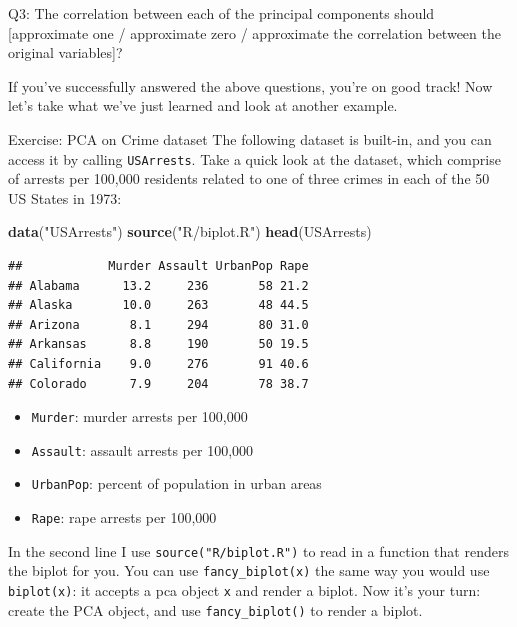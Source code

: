 \documentclass[]{article}
\newenvironment{Shaded}{\begin{snugshade}}{\end{snugshade}}
\newcommand{\KeywordTok}[1]{\textcolor[rgb]{0.13,0.29,0.53}{\textbf{#1}}}
\newcommand{\NormalTok}[1]{#1}
\newcommand{\StringTok}[1]{\textcolor[rgb]{0.31,0.60,0.02}{#1}}
\providecommand{\tightlist}{%
  \setlength{\itemsep}{0pt}\setlength{\parskip}{0pt}}
\begin{document}
Q3: The correlation between each of the principal components should
{[}approximate one / approximate zero / approximate the correlation
between the original variables{]}?

If you've successfully answered the above questions, you're on good
track! Now let's take what we've just learned and look at another
example.

Exercise: PCA on Crime dataset The following dataset is built-in, and
you can access it by calling \texttt{USArrests}. Take a quick look at
the dataset, which comprise of arrests per 100,000 residents related to
one of three crimes in each of the 50 US States in 1973:

\begin{Shaded}
\begin{Highlighting}[]
\KeywordTok{data}\NormalTok{(}\StringTok{"USArrests"}\NormalTok{)}
\KeywordTok{source}\NormalTok{(}\StringTok{"R/biplot.R"}\NormalTok{)}
\KeywordTok{head}\NormalTok{(USArrests)}
\end{Highlighting}
\end{Shaded}

\begin{verbatim}
##            Murder Assault UrbanPop Rape
## Alabama      13.2     236       58 21.2
## Alaska       10.0     263       48 44.5
## Arizona       8.1     294       80 31.0
## Arkansas      8.8     190       50 19.5
## California    9.0     276       91 40.6
## Colorado      7.9     204       78 38.7
\end{verbatim}

\begin{itemize}
\tightlist
\item
  \texttt{Murder}: murder arrests per 100,000\\
\item
  \texttt{Assault}: assault arrests per 100,000\\
\item
  \texttt{UrbanPop}: percent of population in urban areas\\
\item
  \texttt{Rape}: rape arrests per 100,000
\end{itemize}

In the second line I use \texttt{source("R/biplot.R")} to read in a
function that renders the biplot for you. You can use
\texttt{fancy\_biplot(x)} the same way you would use \texttt{biplot(x)}:
it accepts a pca object \texttt{x} and render a biplot. Now it's your
turn: create the PCA object, and use \texttt{fancy\_biplot()} to render
a biplot.
\end{document}
